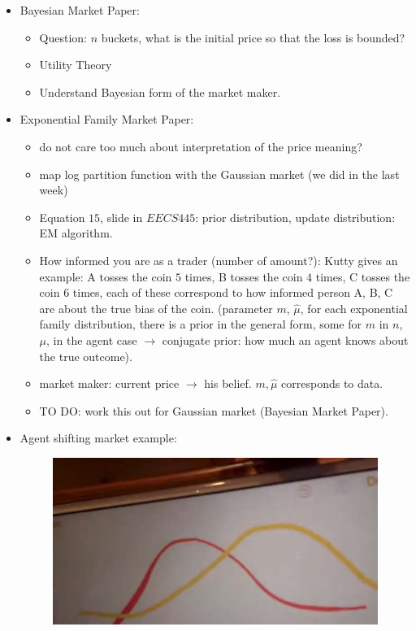 \documentclass{article}
\begin{document}
\begin{itemize}
	\item Bayesian Market Paper:
	      \begin{itemize}
		      \item Question: $n$ buckets, what is the initial price so that the loss is bounded?
		      \item Utility Theory
		      \item Understand Bayesian form of the market maker.
	      \end{itemize}
	\item Exponential Family Market Paper:
	      \begin{itemize}
		      \item do not care too much about interpretation of the price meaning?
		      \item map log partition function with the Gaussian market (we did in the last week)
		      \item Equation $15$, slide in $EECS445$: prior distribution, update distribution: EM algorithm.
		      \item How informed you are as a trader (number of amount?): Kutty gives an example: A tosses the coin $5$ times, B tosses the coin $4$ times, C tosses the coin $6$ times, each of these correspond to how informed person A, B, C are about the true bias of the coin. (parameter $m$, $\hat{\mu}$, for each exponential family distribution, there is a prior in the general form, some for $m$ in $n$, $\mu$, in the agent case $\rightarrow$ conjugate prior: how much an agent knows about the true outcome).
		      \item market maker: current price $\rightarrow$ his belief. $m, \hat{\mu}$ corresponds to data.
		      \item TO DO: work this out for Gaussian market (Bayesian Market Paper).
	      \end{itemize}
	\item Agent shifting market example:
	      \begin{figure}[H]
		      \centering
		      \includegraphics[scale=0.3]{./figure/before.jpg}

\end{figure}
\end{itemize}
\end{document}
